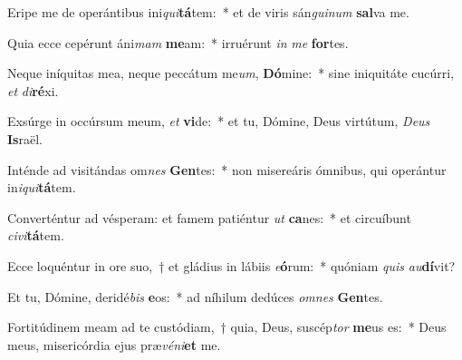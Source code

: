 \item Eripe me de operántibus ini\textit{qui}\textbf{tá}tem:~* et de viris sán\textit{gui}\textit{num} \textbf{sal}va me.
\item Quia ecce cepérunt áni\textit{mam} \textbf{me}am:~* irruérunt \textit{in} \textit{me} \textbf{for}tes.
\item Neque iníquitas mea, neque peccátum me\textit{um}, \textbf{Dó}mine:~* sine iniquitáte cucúrri, \textit{et} \textit{di}\textbf{ré}xi.
\item Exsúrge in occúrsum meum, \textit{et} \textbf{vi}de:~* et tu, Dómine, Deus virtútum, \textit{De}\textit{us} \textbf{Is}raël.
\item Inténde ad visitándas om\textit{nes} \textbf{Gen}tes:~* non misereáris ómnibus, qui operántur in\textit{i}\textit{qui}\textbf{tá}tem.
\item Converténtur ad vésperam: et famem patiéntur \textit{ut} \textbf{ca}nes:~* et circuíbunt \textit{ci}\textit{vi}\textbf{tá}tem.
\item Ecce loquéntur in ore suo,~† et gládius in lábiis \textit{e}\textbf{ó}rum:~* quóniam \textit{quis} \textit{au}\textbf{dí}vit?
\item Et tu, Dómine, deridé\textit{bis} \textbf{e}os:~* ad níhilum dedúces \textit{om}\textit{nes} \textbf{Gen}tes.
\item Fortitúdinem meam ad te custódiam,~† quia, Deus, suscép\textit{tor} \textbf{me}us es:~* Deus meus, misericórdia ejus præ\textit{vé}\textit{ni}\textbf{et} me.
